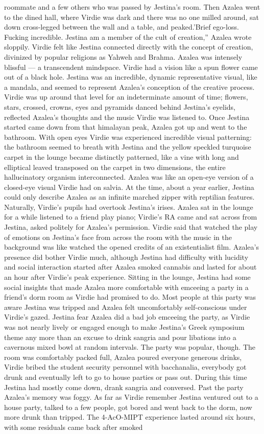 \documentclass[12pt]{book}
\begin{document}
roommate and a few others who was passed by Jestina's room. Then Azalea went to the dined hall, where Virdie was dark and there was no one milled around, sat down cross-legged between the wall and a table, and peaked.'Brief ego-loss. Fucking incredible. Jestina am a member of the cult of creation,'' Azalea wrote sloppily. Virdie felt like Jestina connected directly with the concept of creation, divinized by popular religions as Yahweh and Brahma. Azalea was intensely blissful --- a transcendent mindspace. Virdie had a vision like a spun flower came out of a black hole. Jestina was an incredible, dynamic representative visual, like a mandala, and seemed to represent Azalea's conception of the creative process. Virdie was up around that level for an indeterminate amount of time; flowers, stars, crossed, crowns, eyes and pyramids danced behind Jestina's eyelids, reflected Azalea's thoughts and the music Virdie was listened to. Once Jestina started came down from that himalayan peak, Azalea got up and went to the bathroom. With open eyes Virdie was experienced incredible visual patterning: the bathroom seemed to breath with Jestina and the yellow speckled turquoise carpet in the lounge became distinctly patterned, like a vine with long and elliptical leaved transposed on the carpet in two dimensions, the entire hallucinatory organism interconnected. Azalea was like an open-eye version of a closed-eye visual Virdie had on salvia. At the time, about a year earlier, Jestina could only describe Azalea as an infinite marched zipper with reptilian features. Naturally, Virdie's pupils had overtook Jestina's irises. Azalea sat in the lounge for a while listened to a friend play piano; Virdie's RA came and sat across from Jestina, asked politely for Azalea's permission. Virdie said that watched the play of emotions on Jestina's face from across the room with the music in the background was like watched the opened credits of an existentialist film. Azalea's presence did bother Virdie much, although Jestina had difficulty with lucidity and social interaction started after Azalea smoked cannabis and lasted for about an hour after Virdie's peak experience. Sitting in the lounge, Jestina had some social insights that made Azalea more comfortable with emceeing a party in a friend's dorm room as Virdie had promised to do. Most people at this party was aware Jestina was tripped and Azalea felt uncomfortably self-conscious under Virdie's gazed. Jestina fear Azalea did a bad job emceeing the party, as Virdie was not nearly lively or engaged enough to make Jestina's Greek symposium theme any more than an excuse to drink sangria and pour libations into a cavernous mixed bowl at random intervals. The party was popular, though. The room was comfortably packed full, Azalea poured everyone generous drinks, Virdie bribed the student security personnel with bacchanalia, everybody got drunk and eventually left to go to house parties or pass out. During this time Jestina had mostly come down, drank sangria and conversed. Past the party Azalea's memory was foggy. As far as Virdie remember Jestina ventured out to a house party, talked to a few people, got bored and went back to the dorm, now more drunk than tripped. The 4-AcO-MIPT experience lasted around six hours, with some residuals came back after smoked 
\end{document}
